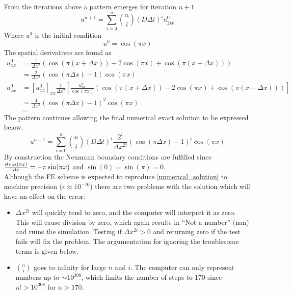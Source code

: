 \noindent From the iterations above a pattern emerges for iteration $n+1$\\
\begin{equation}
 u^{n+1} = \sum\limits_{i=0}^n {n\choose i}\left(D\Delta t\right)^iu^0_{2ix}
\end{equation}
Where $u^0$ is the initial condition
\begin{equation}
 u^0 = \cos(\pi x)
\end{equation}
The spatial derivatives are found as
\begin{align*}
 u^0_{xx} &= \frac{1}{\Delta x^2}\left(\cos(\pi(x+\Delta x)) -2\cos(\pi x) +\cos(\pi(x-\Delta x))\right) \\
 &= \frac{2}{\Delta x^2}\left(\cos(\pi\Delta x)-1\right)\cos(\pi x)\\
 u^0_{4x} &= [u^0_{xx}]_{xx} \frac{1}{\Delta x^2}\left[\frac{u^0_{xx}}{\cos(\pi x)}\left(\cos(\pi(x+\Delta x)) -2\cos(\pi x) +\cos(\pi(x-\Delta x))\right)\right]\\
 &= \frac{4}{\Delta x^2}\left(\cos(\pi\Delta x)-1\right)^2\cos(\pi x)\\
 &\dots
\end{align*}
The pattern continues allowing the final numerical exact solution to be expressed below.
\begin{equation}\label{numerical_solution}
  u^{n+1} = \sum\limits_{i=0}^n {n\choose i}\left(D\Delta t\right)^i\frac{2^i}{\Delta x^{2i}}\left(\cos(\pi\Delta x)-1\right)^i\cos(\pi x)
\end{equation}
By construction the Neumann boundary conditions are fulfilled since $\frac{\partial \cos(\pi x)}{\partial x} = -\pi\sin(\pi x)$ and $\sin(0) = \sin(\pi) = 0$. \\

Although the FE scheme is expected to reproduce \eqref{numerical_solution} to machine precision ($\epsilon \approx 10^{-16}$) there are two problems with the solution which will have an effect on the error:
\begin{itemize}
 \item $\Delta x^{2i}$ will quickly tend to zero, and the computer will interpret it as zero. This will cause division by zero, which again results in ``Not a number'' (nan) and ruins the simulation. Testing if $\Delta x^{2i}>0$ and returning zero if the test fails will fix the problem. The argumentation for ignoring the troublesome terms is given below.
 \item ${n\choose i}$ goes to infinity for large $n$ and $i$. The computer can only represent numbers up to $\sim10^{308}$, which limits the number of steps to $170$ since $n!>10^{308}$ for $n>170$.
\end{itemize}

